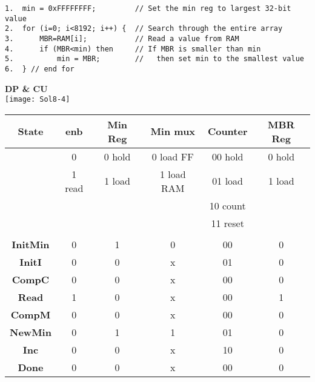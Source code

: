 \begin{enumerate}
\begin{onlysolution}[fragile]
              \begin{verbatim}
1.  min = 0xFFFFFFFF;         // Set the min reg to largest 32-bit value
2.  for (i=0; i<8192; i++) {  // Search through the entire array
3.      MBR=RAM[i];           // Read a value from RAM
4.      if (MBR<min) then     // If MBR is smaller than min
5.          min = MBR;        //   then set min to the smallest value
6.  } // end for
\end{verbatim}
            \textbf{DP \& CU}\\
            \texttt{[image: Sol8-4]}
            \begin{tabular}{c|c|c|c|c|c}
                \textbf{State}   & enb    & Min Reg & Min mux    & Counter  & MBR Reg \\ \hline
                & 0      & 0 hold  & 0 load FF  & 00 hold  & 0 hold  \\ \hline
                & 1 read & 1 load  & 1 load RAM & 01 load  & 1 load  \\ \hline
                &        &         &            & 10 count &         \\ \hline
                &        &         &            & 11 reset &         \\ \hline
                &        &         &            &          &         \\ \hline
                \textbf{InitMin} & 0      & 1       & 0          & 00       & 0       \\ \hline
                \textbf{InitI}   & 0      & 0       & x          & 01       & 0       \\ \hline
                \textbf{CompC}   & 0      & 0       & x          & 00       & 0       \\ \hline
                \textbf{Read}    & 1      & 0       & x          & 00       & 1       \\ \hline
                \textbf{CompM}   & 0      & 0       & x          & 00       & 0       \\ \hline
                \textbf{NewMin}  & 0      & 1       & 1          & 01       & 0       \\ \hline
                \textbf{Inc}     & 0      & 0       & x          & 10       & 0       \\ \hline
                \textbf{Done}    & 0      & 0       & x          & 00       & 0       \\
            \end{tabular}\\

\end{onlysolution}
\end{enumerate}
